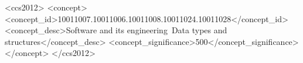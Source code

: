 \documentclass[sigplan, review, 10pt]{acmart}
\begin{document}


\begin{CCSXML}
<ccs2012>
<concept>
<concept_id>10011007.10011006.10011008.10011024.10011028</concept_id>
<concept_desc>Software and its engineering~Data types and structures</concept_desc>
<concept_significance>500</concept_significance>
</concept>
</ccs2012>
\end{CCSXML}





\maketitle











\end{document}
